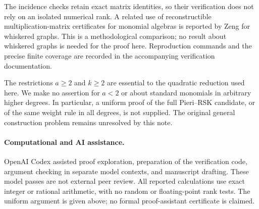 \documentclass[11pt,a4paper]{article}
\begin{document}
The incidence checks retain exact matrix identities, so their verification
does not rely on an isolated numerical rank. A related use of reconstructible
multiplication-matrix certificates for monomial algebras is reported by
Zeng \cite{ZengWhiskered} for whiskered graphs. This is a
methodological comparison; no result about whiskered graphs is needed
for the proof here. Reproduction commands and the precise finite coverage
are recorded in the accompanying verification documentation.

The restrictions $a\geq2$ and $k\geq2$ are essential to the quadratic
reduction used here. We make no assertion for $a<2$ or about standard
monomials in arbitrary higher degrees. In particular, a uniform proof of
the full Pieri--RSK candidate, or of the same weight rule in all degrees,
is not supplied. The original general construction problem remains
unresolved by this note.

\paragraph{Computational and AI assistance.}
OpenAI Codex assisted proof exploration, preparation of the verification
code, argument checking in separate model contexts, and manuscript drafting.
These model passes are not external peer review. All reported calculations
use exact integer or rational arithmetic, with no random or floating-point
rank tests. The uniform argument is given above; no formal proof-assistant
certificate is claimed.



\end{document}
